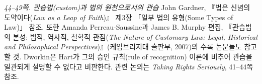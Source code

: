 \documentclass[12pt, oneside]{book}  %
\begin{document}
\emph{44--49쪽. 관습법(custom)과 법의 원천으로서의 관습} John Gardner,
『법은 신념의 도약이다(\emph{Law as a Leap of Faith})』 제3장 「일부
법의 유형(Some Types of Law)」 참조. 또한 Amanda Perreau-Saussine과
James B. Murphy 편집, 『관습법의 본성: 법적, 역사적, 철학적
관점(\emph{The Nature of Customary Law: Legal, Historical and
Philosophical Perspectives})』(케임브리지대 출판부, 2007)의 수록
논문들도 참고할 것. Dworkin은 Hart가 그의 승인 규칙(rule of recognition)
이론에 비추어 관습을 일관되게 설명할 수 없다고 비판한다. 관련 논의는
\emph{Taking Rights Seriously}, 41--44쪽 참조.
\end{document}
